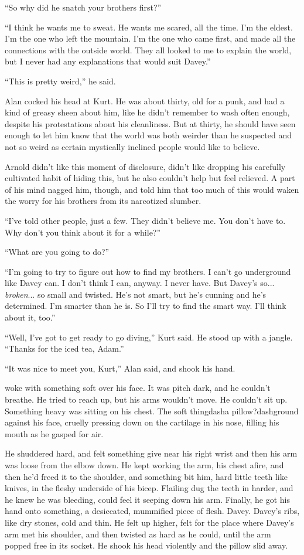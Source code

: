 ``So why did he snatch your brothers first?''

``I think he wants me to sweat.  He wants me scared, all the time. 
I'm the eldest.  I'm the one who left the mountain.  I'm the one who
came first, and made all the connections with the outside world.  They
all looked to me to explain the world, but I never had any
explanations that would suit Davey.''

``This is pretty weird,'' he said.

Alan cocked his head at Kurt.  He was about thirty, old for a punk,
and had a kind of greasy sheen about him, like he didn't remember to
wash often enough, despite his protestations about his cleanliness. 
But at thirty, he should have seen enough to let him know that the
world was both weirder than he suspected and not so weird as certain
mystically inclined people would like to believe.

Arnold didn't like this moment of disclosure, didn't like dropping his
carefully cultivated habit of hiding this, but he also couldn't help
but feel relieved.  A part of his mind nagged him, though, and told
him that too much of this would waken the worry for his brothers from
its narcotized slumber.

``I've told other people, just a few.  They didn't believe me.  You
don't have to.  Why don't you think about it for a while?''

``What are you going to do?''

``I'm going to try to figure out how to find my brothers.  I can't go
underground like Davey can.  I don't think I can, anyway.  I never
have.  But Davey's so...  \textit{broken}...  so small and twisted. 
He's not smart, but he's cunning and he's determined.  I'm smarter
than he is.  So I'll try to find the smart way.  I'll think about it,
too.''

``Well, I've got to get ready to go diving,'' Kurt said.  He stood up
with a jangle.  ``Thanks for the iced tea, Adam.''

``It was nice to meet you, Kurt,'' Alan said, and shook his hand.

 woke with something soft over his face.  It was pitch dark, and
he couldn't breathe.  He tried to reach up, but his arms wouldn't
move.  He couldn't sit up.  Something heavy was sitting on his chest. 
The soft thingdash{}a pillow?dash{}ground against his face, cruelly pressing
down on the cartilage in his nose, filling his mouth as he gasped for
air.

He shuddered hard, and felt something give near his right wrist and
then his arm was loose from the elbow down.  He kept working the arm,
his chest afire, and then he'd freed it to the shoulder, and something
bit him, hard little teeth like knives, in the fleshy underside of his
bicep.  Flailing dug the teeth in harder, and he knew he was bleeding,
could feel it seeping down his arm.  Finally, he got his hand onto
something, a desiccated, mummified piece of flesh.  Davey.  Davey's
ribs, like dry stones, cold and thin.  He felt up higher, felt for the
place where Davey's arm met his shoulder, and then twisted as hard as
he could, until the arm popped free in its socket.  He shook his head
violently and the pillow slid away.


